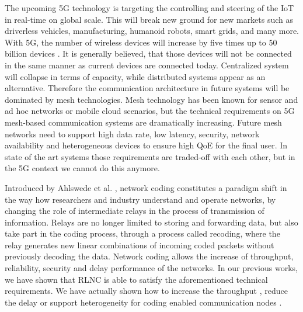 %

The upcoming 5G technology is targeting the controlling and steering of the \ac{IoT} in real-time on global scale. This will break new ground for new markets such as driverless vehicles, manufacturing, humanoid robots, smart grids, and many more. With 5G, the number of wireless devices will increase by five times up to 50 billion devices \cite{cisco2011forecast}. It is generally believed, that those devices will not be connected in the same manner as current devices are connected today. Centralized system will collapse in terms of capacity, while distributed systems appear as an alternative. Therefore the communication architecture in future systems will be dominated by mesh technologies. Mesh technology has been known for sensor and ad hoc networks or mobile cloud scenarios, but the technical requirements on 5G mesh-based communication systems are dramatically increasing. Future mesh networks need to support high data rate, low latency, security, network availability and heterogeneous devices to ensure high \ac{QoE} for the final user. In state of the art systems those requirements are traded-off with each other, but in the 5G context we cannot do this anymore.

Introduced by Ahlswede et al. \cite{ahlswede2000network}, network coding constitutes a paradigm shift in the way how researchers and industry understand and operate networks, by changing the role of intermediate relays in the process of transmission of information. Relays are no longer limited to storing and forwarding data, but also take part in the coding process, through a process called recoding, where the relay generates new linear combinations of incoming coded packets without previously decoding the data. Network coding allows the increase of throughput, reliability, security and delay performance of the networks. In our previous works, we have shown that \ac{RLNC} \cite{koetter2003algebraic,ho2006random} is able to satisfy the aforementioned technical requirements. We have actually shown how to increase the throughput \cite{pahlevani2013playncool}, reduce the delay \cite{szabo2015towards} or support heterogeneity for coding enabled communication nodes \cite{lucani2014fulcrum}.

